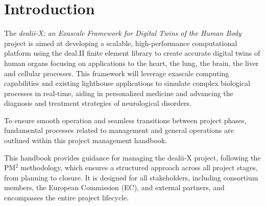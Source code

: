 \documentclass[a4paper,12pt]{article}
\begin{document}
\newpage

\tableofcontents %

\newpage

\section{\textcolor{EUblue}{Introduction}}

The \emph{dealii-X: an Exascale Framework for Digital Twins of the Human Body} project is aimed at developing
a scalable, high-performance computational platform using the deal.II finite element library to create accurate digital twins of human organs focusing on applications to the heart, the lung, the brain, the liver and cellular processes. This framework will leverage exascale computing capabilities and existing lighthouse applications to simulate complex biological processes in real-time, aiding in personalized medicine and advancing the diagnosis and treatment strategies of neurological disorders. 

To ensure smooth operation and seamless transitions between project phases, fundamental processes related to management and general operations are outlined within this project management handbook.

This handbook provides guidance for managing the dealii-X project, following the PM$^2$ methodology, which ensures a structured approach across all project stages, from planning to closure. It is designed for all stakeholders, including consortium members, the European Commission (EC), and external partners, and encompasses the entire project lifecycle.
\end{document}
